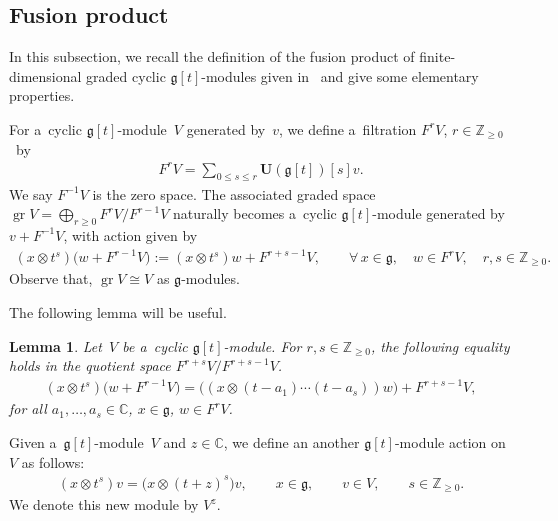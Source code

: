 \documentclass[11pt]{article}
\newtheorem{lemma}{Lemma}
\DeclareMathOperator{\gr}{gr}
\numberwithin{equation}{section}
\begin{document}
\subsection{Fusion product}\label{section3.3}

In this subsection, we recall the def\/inition of the fusion product of f\/inite-dimensional graded cyclic
$\mathfrak{g}[t]$-modules given in~\cite{FL} and give some elementary properties.

For a~cyclic $\mathfrak{g}[t]$-module~$V$ generated by~$v$, we def\/ine a~f\/iltration $F^{r}V$, $r\in\mathbb{Z}_{\geq 0}$~by
\begin{gather*}
F^{r}V=\sum\limits_{0\leq s \leq r} \mathbf{U}(\mathfrak{g}[t])[s] v.
\end{gather*}
We say $F^{-1}V$ is the zero space.
The associated graded space $\gr V=\bigoplus_{r\geq 0} F^{r}V/ F^{r-1}V $ naturally becomes a~cyclic
$\mathfrak{g}[t]$-module generated by $v+F^{-1}V$, with action given by
\begin{gather*}
(x\otimes t^s)\big(w+F^{r-1}V\big):= (x\otimes t^s)w+F^{r+s-1}V,
\qquad
\forall\,
x\in \mathfrak{g},
\quad
w\in F^{r}V, \quad
r, s\in \mathbb{Z}_{\geq0}.
\end{gather*}
Observe that, $\gr V \cong V$ as $\mathfrak{g}$-modules.

The following lemma will be useful.
\begin{lemma}
\label{f1}
Let~$V$ be a~cyclic $\mathfrak{g}[t]$-module.
For $r,s\in \mathbb{Z}_{\geq0}$, the following equality holds in the quotient space $F^{r+s}V/ F^{r+s-1}V$.
\begin{gather*}
(x\otimes t^s)\big(w+F^{r-1}V\big)=\big((x\otimes (t-a_1)\cdots (t-a_s))w\big) + F^{r+s-1}V,
\end{gather*}
for all $a_1,\dots,a_s\in\mathbb{C}$,
$x\in \mathfrak{g}$, $w\in F^{r}V$.
\end{lemma}

Given a~$\mathfrak{g}[t]$-module~$V$ and $z\in\mathbb{C}$, we def\/ine an another $\mathfrak{g}[t]$-module action on~$V$
as follows:
\begin{gather*}
(x\otimes t^s)v=\big(x\otimes (t+z)^s\big)v,
\qquad
x\in\mathfrak{g},
\qquad
v\in V,
\qquad
s\in \mathbb{Z}_{\geq0}.
\end{gather*}
We denote this new module by $V^z$.
\end{document}
